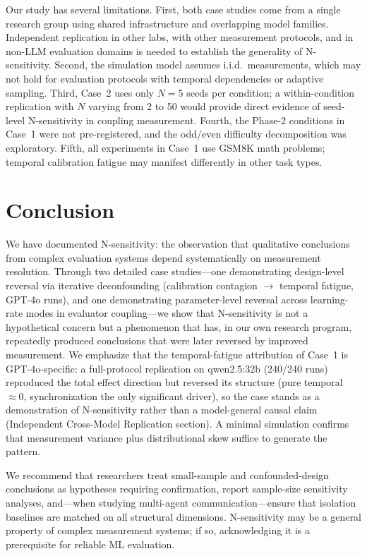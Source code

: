 \documentclass[11pt]{article}
\begin{document}
Our study has several limitations. First, both case studies come from a single research group using shared infrastructure and overlapping model families. Independent replication in other labs, with other measurement protocols, and in non-LLM evaluation domains is needed to establish the generality of N-sensitivity. Second, the simulation model assumes i.i.d.\ measurements, which may not hold for evaluation protocols with temporal dependencies or adaptive sampling. Third, Case~2 uses only $N{=}5$ seeds per condition; a within-condition replication with $N$ varying from 2 to 50 would provide direct evidence of seed-level N-sensitivity in coupling measurement. Fourth, the Phase-2 conditions in Case~1 were not pre-registered, and the odd/even difficulty decomposition was exploratory. Fifth, all experiments in Case~1 use GSM8K math problems; temporal calibration fatigue may manifest differently in other task types.

\section{Conclusion}

We have documented N-sensitivity: the observation that qualitative conclusions from complex evaluation systems depend systematically on measurement resolution. Through two detailed case studies---one demonstrating design-level reversal via iterative deconfounding (calibration contagion $\to$ temporal fatigue, GPT-4o runs), and one demonstrating parameter-level reversal across learning-rate modes in evaluator coupling---we show that N-sensitivity is not a hypothetical concern but a phenomenon that has, in our own research program, repeatedly produced conclusions that were later reversed by improved measurement. We emphasize that the temporal-fatigue attribution of Case~1 is GPT-4o-specific: a full-protocol replication on qwen2.5:32b (240/240 runs) reproduced the total effect direction but reversed its structure (pure temporal $\approx 0$, synchronization the only significant driver), so the case stands as a demonstration of N-sensitivity rather than a model-general causal claim (Independent Cross-Model Replication section). A minimal simulation confirms that measurement variance plus distributional skew suffice to generate the pattern.

We recommend that researchers treat small-sample and confounded-design conclusions as hypotheses requiring confirmation, report sample-size sensitivity analyses, and---when studying multi-agent communication---ensure that isolation baselines are matched on all structural dimensions. N-sensitivity may be a general property of complex measurement systems; if so, acknowledging it is a prerequisite for reliable ML evaluation.
\end{document}

